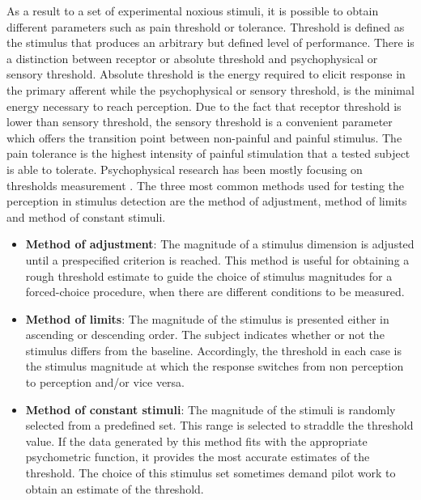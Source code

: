 As a result to a set of experimental noxious stimuli, it is possible to obtain different parameters such as pain threshold or tolerance. Threshold is defined as the stimulus that produces an arbitrary but defined level of performance. There is a distinction between receptor or absolute threshold and psychophysical or sensory threshold. Absolute threshold is the energy required to elicit response in the primary afferent while the psychophysical or sensory threshold, is the minimal energy necessary to reach perception. Due to the fact that receptor threshold is lower than sensory threshold, the sensory threshold is a convenient parameter which offers the transition point between non-painful and painful stimulus. \cite{Yarnitsky2006} The pain tolerance is the highest intensity of painful stimulation that a tested subject is able to tolerate. 
Psychophysical research has been mostly focusing on thresholds measurement \cite{Pelli2010}. The three most common methods used for testing the perception in stimulus detection are the method of adjustment, method of limits and method of constant stimuli.


\begin{itemize}
	\item \textbf{Method of adjustment}: The magnitude of a stimulus dimension is adjusted until a prespecified criterion is reached. This method is useful for obtaining a rough threshold estimate to guide the choice of stimulus magnitudes for a forced-choice procedure, when there are different conditions to be measured. \cite{Kingdom2016}
	\item \textbf{Method of limits}: The magnitude of the stimulus is presented either in ascending or descending order.
	The subject indicates whether or not the stimulus differs from the baseline. Accordingly, the threshold in each case is the stimulus magnitude at which the response switches from non perception to perception and/or vice versa. \cite{Kingdom2016}
	\item \textbf{Method of constant stimuli}: The magnitude of the stimuli is randomly selected from a predefined set. This range is selected to straddle the threshold value. If the data generated by this method fits with the appropriate psychometric function, it provides the most accurate estimates of the threshold. The choice of this stimulus set sometimes demand pilot work to obtain an estimate of the threshold. \cite{Kingdom2016}
\end{itemize}

